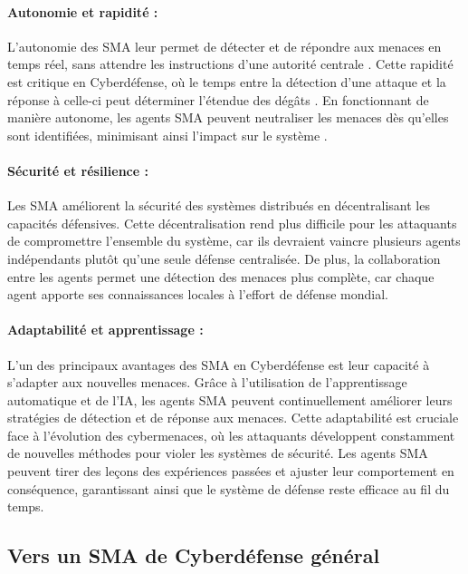 \paragraph{Autonomie et rapidité :}
L'autonomie des SMA leur permet de détecter et de répondre aux menaces en temps réel, sans attendre les instructions d'une autorité centrale \cite{shamshirband2014cooperative}. Cette rapidité est critique en Cyberdéfense, où le temps entre la détection d'une attaque et la réponse à celle-ci peut déterminer l'étendue des dégâts \cite{liao2013intrusion}. En fonctionnant de manière autonome, les agents SMA peuvent neutraliser les menaces dès qu'elles sont identifiées, minimisant ainsi l'impact sur le système \cite{shamshirband2018computational}.

\paragraph{Sécurité et résilience :}
Les SMA améliorent la sécurité des systèmes distribués en décentralisant les capacités défensives. Cette décentralisation rend plus difficile pour les attaquants de compromettre l'ensemble du système, car ils devraient vaincre plusieurs agents indépendants plutôt qu'une seule défense centralisée. De plus, la collaboration entre les agents permet une détection des menaces plus complète, car chaque agent apporte ses connaissances locales à l'effort de défense mondial.

\paragraph{Adaptabilité et apprentissage :}
L'un des principaux avantages des SMA en Cyberdéfense est leur capacité à s'adapter aux nouvelles menaces. Grâce à l'utilisation de l'apprentissage automatique et de l'IA, les agents SMA peuvent continuellement améliorer leurs stratégies de détection et de réponse aux menaces. Cette adaptabilité est cruciale face à l'évolution des cybermenaces, où les attaquants développent constamment de nouvelles méthodes pour violer les systèmes de sécurité. Les agents SMA peuvent tirer des leçons des expériences passées et ajuster leur comportement en conséquence, garantissant ainsi que le système de défense reste efficace au fil du temps.

\subsection{Vers un SMA de Cyberdéfense général}

